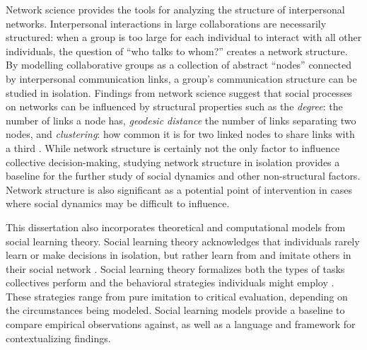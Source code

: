 Network science provides the tools for analyzing the structure of interpersonal
networks.
Interpersonal interactions in large collaborations are necessarily structured:
when a group is too large for each individual to interact with all other individuals,
the question of ``who talks to whom?'' creates a network structure.
By modelling collaborative groups as a collection of abstract ``nodes''
connected by interpersonal communication links,
a group's communication structure can be studied in isolation.
Findings from network science suggest that social processes on networks can be
influenced by structural properties such as
the {\em degree}: the number of links a node has,
{\em geodesic distance} the number of links separating two nodes,
and {\em clustering}: how common it is for two linked nodes to share links with
a third \cite{boccaletti_complex_2006}.
While network structure is certainly not the only factor to influence collective
decision-making,
studying network structure in isolation provides a baseline for the
further study of social dynamics and other non-structural factors.
Network structure is also significant as a potential point of intervention in
cases where social dynamics may be difficult to influence.

This dissertation also incorporates theoretical and computational models from
social learning theory.
Social learning theory acknowledges that individuals rarely
learn or make decisions in isolation, but rather learn from and imitate others
in their social network
\cite{golub_naive_2010}.
Social learning theory
formalizes both the types of tasks collectives perform
\cite{hong_interpreted_2009}
and the behavioral strategies individuals might employ
\cite{lazer_network_2007, barkoczi_social_2016}.
These strategies range from pure imitation to critical evaluation,
depending on the circumstances being modeled.
Social learning models provide a baseline to compare empirical observations
against,
as well as a language and framework for contextualizing findings.

